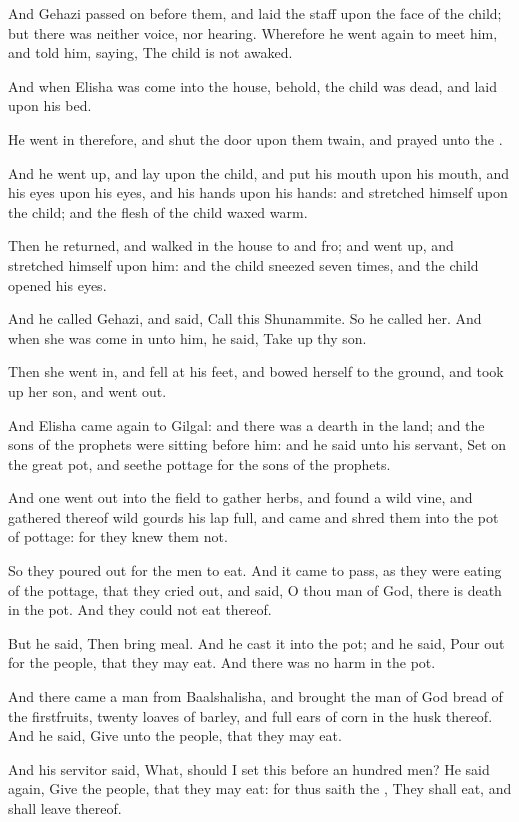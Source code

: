 \verse And Gehazi passed on before them, and laid the staff upon the face of the child; but there was neither voice, nor hearing. Wherefore he went again to meet him, and told him, saying, The child is not awaked.

\verse And when Elisha was come into the house, behold, the child was dead, and laid upon his bed.

\verse He went in therefore, and shut the door upon them twain, and prayed unto the \LORD.

\verse And he went up, and lay upon the child, and put his mouth upon his mouth, and his eyes upon his eyes, and his hands upon his hands: and stretched himself upon the child; and the flesh of the child waxed warm.

\verse Then he returned, and walked in the house to and fro; and went up, and stretched himself upon him: and the child sneezed seven times, and the child opened his eyes.

\verse And he called Gehazi, and said, Call this Shunammite. So he called her. And when she was come in unto him, he said, Take up thy son.

\verse Then she went in, and fell at his feet, and bowed herself to the ground, and took up her son, and went out.

\verse And Elisha came again to Gilgal: and there was a dearth in the land; and the sons of the prophets were sitting before him: and he said unto his servant, Set on the great pot, and seethe pottage for the sons of the prophets.

\verse And one went out into the field to gather herbs, and found a wild vine, and gathered thereof wild gourds his lap full, and came and shred them into the pot of pottage: for they knew them not.

\verse So they poured out for the men to eat. And it came to pass, as they were eating of the pottage, that they cried out, and said, O thou man of God, there is death in the pot. And they could not eat thereof.

\verse But he said, Then bring meal. And he cast it into the pot; and he said, Pour out for the people, that they may eat. And there was no harm in the pot.

\verse And there came a man from Baalshalisha, and brought the man of God bread of the firstfruits, twenty loaves of barley, and full ears of corn in the husk thereof. And he said, Give unto the people, that they may eat.

\verse And his servitor said, What, should I set this before an hundred men?  He said again, Give the people, that they may eat: for thus saith the \LORD, They shall eat, and shall leave thereof.

